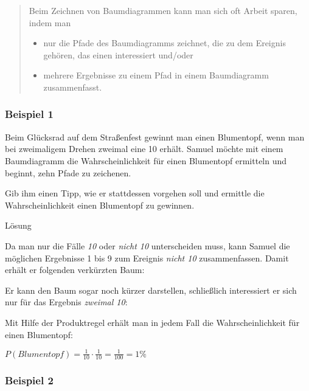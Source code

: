 \documentclass[
  ngerman,
]{book}
\begin{document}
\begin{quote}
Beim Zeichnen von Baumdiagrammen kann man sich oft Arbeit sparen, indem man

\begin{itemize}
\item
  nur die Pfade des Baumdiagramms zeichnet, die zu dem Ereignis gehören, das einen interessiert und/oder
\item
  mehrere Ergebnisse zu einem Pfad in einem Baumdiagramm zusammenfasst.
\end{itemize}
\end{quote}

\hypertarget{beispiel-1-1}{%
\subsubsection*{Beispiel 1}\label{beispiel-1-1}}

Beim Glücksrad auf dem Straßenfest gewinnt man einen Blumentopf, wenn man bei zweimaligem Drehen zweimal eine 10 erhält. Samuel möchte mit einem Baumdiagramm die Wahrscheinlichkeit für einen Blumentopf ermitteln und beginnt, zehn Pfade zu zeichenen.

Gib ihm einen Tipp, wie er stattdessen vorgehen soll und ermittle die Wahrscheinlichkeit einen Blumentopf zu gewinnen.

Lösung

Da man nur die Fälle \emph{10} oder \emph{nicht 10} unterscheiden muss, kann Samuel die möglichen Ergebnisse 1 bis 9 zum Ereignis \emph{nicht 10} zusammenfassen. Damit erhält er folgenden verkürzten Baum:

Er kann den Baum sogar noch kürzer darstellen, schließlich interessiert er sich nur für das Ergebnis \emph{zweimal 10}:

Mit Hilfe der Produktregel erhält man in jedem Fall die Wahrscheinlichkeit für einen Blumentopf:

\(P(Blumentopf)=\frac{1}{10} \cdot \frac{1}{10} = \frac{1}{100} = 1\%\)

\hypertarget{section-154}{%
\subsubsection*{}\label{section-154}}

\hypertarget{beispiel-2-1}{%
\subsubsection*{Beispiel 2}\label{beispiel-2-1}}
\end{document}

